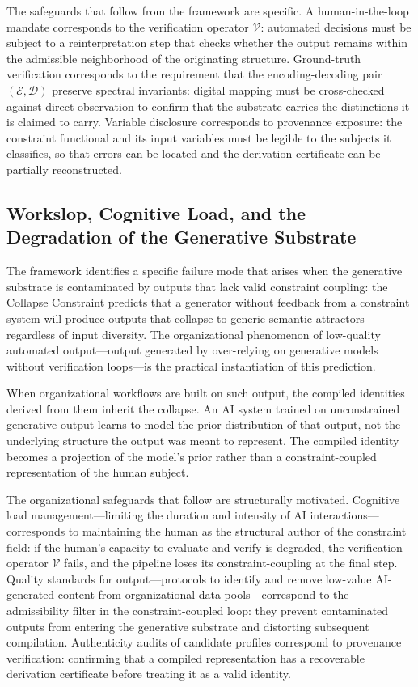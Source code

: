 \documentclass[12pt, a4paper]{article}
\theoremstyle{plain}
\theoremstyle{definition}
\theoremstyle{remark}
\begin{document}
The safeguards that follow from the framework are specific. A human-in-the-loop mandate corresponds to the verification operator $\mathcal{V}$: automated decisions must be subject to a reinterpretation step that checks whether the output remains within the admissible neighborhood of the originating structure. Ground-truth verification corresponds to the requirement that the encoding-decoding pair $(\mathcal{E}, \mathcal{D})$ preserve spectral invariants: digital mapping must be cross-checked against direct observation to confirm that the substrate carries the distinctions it is claimed to carry. Variable disclosure corresponds to provenance exposure: the constraint functional and its input variables must be legible to the subjects it classifies, so that errors can be located and the derivation certificate can be partially reconstructed.

\subsection{Workslop, Cognitive Load, and the Degradation of the Generative Substrate}

The framework identifies a specific failure mode that arises when the generative substrate is contaminated by outputs that lack valid constraint coupling: the Collapse Constraint predicts that a generator without feedback from a constraint system will produce outputs that collapse to generic semantic attractors regardless of input diversity. The organizational phenomenon of low-quality automated output---output generated by over-relying on generative models without verification loops---is the practical instantiation of this prediction.

When organizational workflows are built on such output, the compiled identities derived from them inherit the collapse. An AI system trained on unconstrained generative output learns to model the prior distribution of that output, not the underlying structure the output was meant to represent. The compiled identity becomes a projection of the model's prior rather than a constraint-coupled representation of the human subject.

The organizational safeguards that follow are structurally motivated. Cognitive load management---limiting the duration and intensity of AI interactions---corresponds to maintaining the human as the structural author of the constraint field: if the human's capacity to evaluate and verify is degraded, the verification operator $\mathcal{V}$ fails, and the pipeline loses its constraint-coupling at the final step. Quality standards for output---protocols to identify and remove low-value AI-generated content from organizational data pools---correspond to the admissibility filter in the constraint-coupled loop: they prevent contaminated outputs from entering the generative substrate and distorting subsequent compilation. Authenticity audits of candidate profiles correspond to provenance verification: confirming that a compiled representation has a recoverable derivation certificate before treating it as a valid identity.
\end{document}
